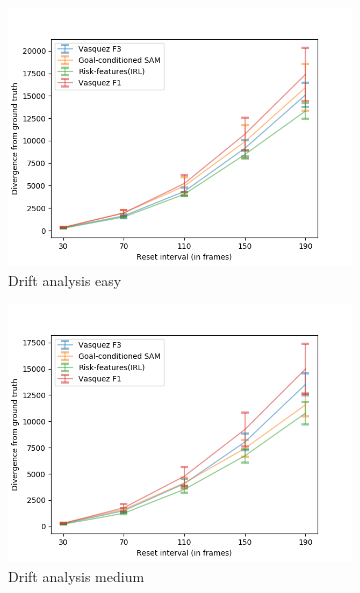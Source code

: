\begin{figure}[htbp]
	\begin{subfigure}{0.5\textwidth}
		\centering
		\includegraphics[width=\linewidth]{plots/ucy_inter_irl_new/drift_easy_ucy_inter_irl.png}
		\caption {Drift analysis easy}
		\label{fig:inter_IRL-drift_analysis_easy}
	\end{subfigure}
	\begin{subfigure}{0.5\textwidth}
		\centering
		\includegraphics[width=\linewidth]{plots/ucy_inter_irl_new/drift_med_ucy_inter_irl.png}
		\caption {Drift analysis medium}
		\label{fig:inter_IRL-drift_analysis_med}
	\end{subfigure}
	\begin{subfigure}{0.5\textwidth}

\end{subfigure}
\end{figure}

